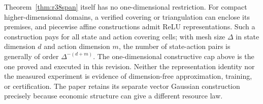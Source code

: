 Theorem~\ref{thm:r38span} itself has no one-dimensional restriction. For
compact higher-dimensional domains, a verified covering or triangulation
can enclose its premises, and piecewise affine constructions admit ReLU
representations. Such a construction pays for all state and action covering
cells; with mesh size $\Delta$ in state dimension $d$ and action dimension
$m$, the number of state-action pairs is generally of order
$\Delta^{-(d+m)}$. The one-dimensional constructive cap above is the one
proved and executed in this revision. Neither the representation identity
nor the measured experiment is evidence of dimension-free approximation,
training, or certification. The paper retains its separate vector Gaussian
construction precisely because economic structure can give a different
resource law.
